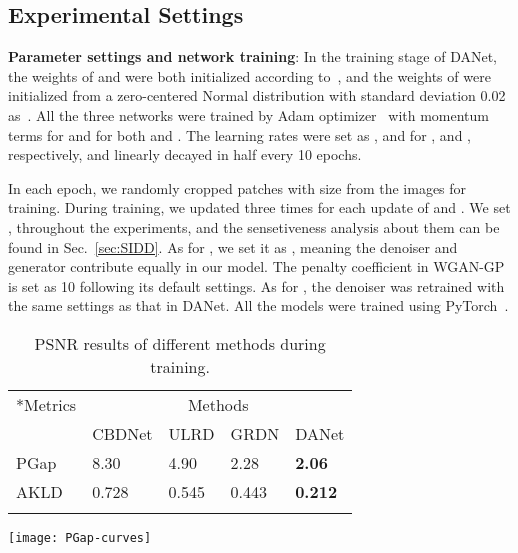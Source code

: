 \documentclass[runningheads]{llncs}
\begin{document}
\subsection{Experimental Settings}

\textbf{Parameter settings and network training}: In the training stage of DANet, the weights of  and
 were both initialized according to~\cite{he2015delving}, and the weights of  were
initialized from a zero-centered Normal
distribution with standard deviation 0.02 as~\cite{Radford2016}. All the three networks were trained by
Adam optimizer~\cite{Kingma2015} with momentum terms  for  and 
for both  and . The learning rates were set as ,  and  for ,  and
, respectively, and linearly decayed in half every 10 epochs.

In each epoch, we randomly cropped  patches with size  from the images for training.
During training, we updated  three times for each update of  and .
We set ,  throughout
the experiments, and the sensetiveness analysis about them can be found in
Sec.~\ref{sec:SIDD}. As for , we set it as , meaning the denoiser  and 
generator  contribute equally in our model. The penalty coefficient in
WGAN-GP~\cite{gulrajani2017improved} is set as 10 following its default settings. 
As for , the denoiser  was retrained with the same settings as that in DANet.  
All the models were trained using PyTorch~\cite{paszke2019pytorch}.


\begin{table}[t]
\begin{flushleft}
\makeatletter{}\makeatother
\begin{minipage}[c][3.6cm][c]{0.58\textwidth}
    \caption{The PGap and AKLD performances of different compared methods on the SIDD validation
        data set. And the best results are highlighted in bold.}
    \small
    \begin{tabular}{@{}C{1.5cm}@{}|@{}C{1.6cm}@{}@{}C{1.2cm}@{}@{}C{1.3cm}@{}@{}C{1.4cm}@{}}
        \Xhline{0.8pt}
        *{Metrics}   &  \\
                            & CBDNet & ULRD   & GRDN   & DANet         \\
        \Xhline{0.4pt}
        PGap    & 8.30   & 4.90   & 2.28   & \textbf{2.06}  \\
        \Xhline{0.4pt}
        AKLD    & 0.728  & 0.545  & 0.443  & \textbf{0.212}  \\
        \Xhline{0.8pt}
    \end{tabular}
    \label{tab:PGap}
\end{minipage} \hspace{5mm}
\makeatletter{}\makeatother
\begin{minipage}[c][3.6cm][c]{0.34\textwidth}
    \centering
    \vspace{4mm}
    \texttt{[image: PGap-curves]}
    \caption{\scriptsize PSNR results of different methods during training.}
    \label{fig:PGap}
\end{minipage}
\end{flushleft}
\vspace{-6mm}
\end{table}
\end{document}
